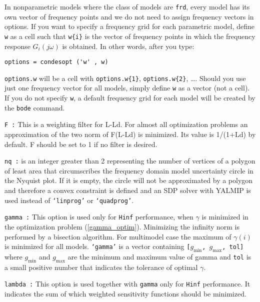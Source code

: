 \documentclass [12pt , a4paper] {report}
\begin{document}

\begin{description}
\item[\texttt{w :}] In nonparametric models where the class of models are \texttt{frd}, every model has its own vector of frequency points and we do not need to assign frequency vectors in options. 
If you want to specify a frequency grid for each parametric model, define \texttt{w} as a cell such that \texttt{w\{i\}} is the vector of frequency points in which the frequency response $G_i(j\omega)$ is obtained. In other words, after you type:
\begin{lstlisting}
options = condesopt ('w' , w)
\end{lstlisting}
\texttt{options.w} will be a cell with \texttt{options.w\{1\}}, \texttt{options.w\{2\}}, \dots. Should you use just one frequency vector for all models, simply define \texttt{w} as a vector (not a cell). If you do not specify \texttt{w}, a default frequency grid for each model will be created by the \texttt{bode} command. 

\item{\tt F :}      This is a weighting filter for L-Ld. For almost all optimization problems an approximation of the two norm of F(L-Ld) is minimized. Its value is 1/(1+Ld) by default. F should be set to 1 if no filter is desired.


\item{\tt nq :}  is an integer greater than 2 representing the number of vertices of a polygon of least area that circumscribes 
the frequency domain model uncertainty circle in the Nyquist plot. If it is empty, the circle will not be approximated 
by a polygon and therefore a convex constraint is defined and an SDP solver with YALMIP is used instead of {\tt `linprog'} or {\tt `quadprog'}.    

 \item{\tt gamma :}    This option is used only for {\tt Hinf} performance, when $\gamma$ is minimized in the optimization problem (\ref{gamma_optim}).
 Minimizing the infinity norm is performed by a bisection algorithm. For multimodel case the
 maximum of $\gamma(i)$ is minimized for all models. {\tt `gamma'} is a vector containing {\tt [$g_{\min}$, $g_{\max}$, tol]} where $g_{\min}$ and $g_{\max}$ are the minimum and maximum value of gamma and {\tt tol} is a small positive number that indicates the tolerance of optimal $\gamma$.

 \item{\tt lambda :}   This option is used together with {\tt gamma} only for {\tt Hinf} performance. 
  It indicates the sum of which weighted sensitivity functions should be minimized. 
  

\end{description}
\end{document}
